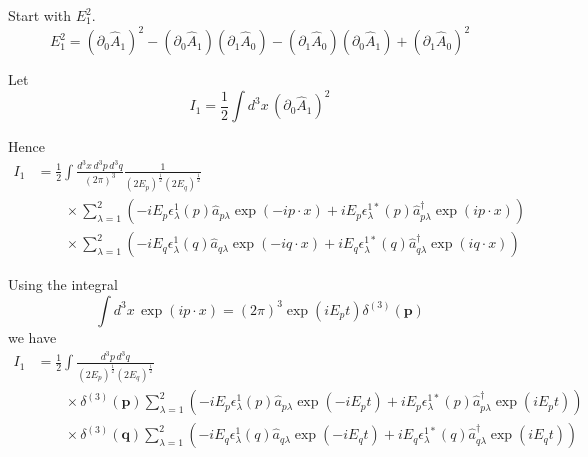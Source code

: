 \documentclass[12pt]{article}
\begin{document}
Start with $E_1^2$.
\begin{equation*}
E_1^2=(\partial_0\hat A_1)^2
-(\partial_0\hat A_1)(\partial_1\hat A_0)
-(\partial_1\hat A_0)(\partial_0\hat A_1)
+(\partial_1\hat A_0)^2
\end{equation*}

Let
\begin{equation*}
I_1=\frac{1}{2}\int d^3x\,(\partial_0\hat A_1)^2
\end{equation*}

Hence
\begin{align*}
I_1&=\frac{1}{2}\int
\frac{d^3x\,d^3p\,d^3q}{(2\pi)^3}\frac{1}{(2E_p)^\frac{1}{2}(2E_q)^\frac{1}{2}}
\\
&\qquad
{}\times\sum_{\lambda=1}^2
\left(
-iE_p\epsilon_\lambda^1(p)\hat a_{p\lambda}\exp(-ip\cdot x)
+iE_p\epsilon_\lambda^{1*}(p)\hat a_{p\lambda}^\dag\exp(ip\cdot x)
\right)
\\
&\qquad
{}\times\sum_{\lambda=1}^2
\left(
-iE_q\epsilon_\lambda^1(q)\hat a_{q\lambda}\exp(-iq\cdot x)
+iE_q\epsilon_\lambda^{1*}(q)\hat a_{q\lambda}^\dag\exp(iq\cdot x)
\right)
\end{align*}

Using the integral
\begin{equation*}
\int d^3x\,\exp(ip\cdot x)=(2\pi)^3\exp(iE_pt)\delta^{(3)}(\mathbf p)
\end{equation*}
we have
\begin{align*}
I_1&=\frac{1}{2}\int
\frac{d^3p\,d^3q}{(2E_p)^\frac{1}{2}(2E_q)^\frac{1}{2}}
\\
&\qquad
{}\times
\delta^{(3)}(\mathbf p)
\sum_{\lambda=1}^2
\left(
-iE_p\epsilon_\lambda^1(p)\hat a_{p\lambda}\exp(-iE_pt)
+iE_p\epsilon_\lambda^{1*}(p)\hat a_{p\lambda}^\dag\exp(iE_pt)
\right)
\\
&\qquad
{}\times
\delta^{(3)}(\mathbf q)
\sum_{\lambda=1}^2
\left(
-iE_q\epsilon_\lambda^1(q)\hat a_{q\lambda}\exp(-iE_qt)
+iE_q\epsilon_\lambda^{1*}(q)\hat a_{q\lambda}^\dag\exp(iE_qt)
\right)
\end{align*}

\end{document}

